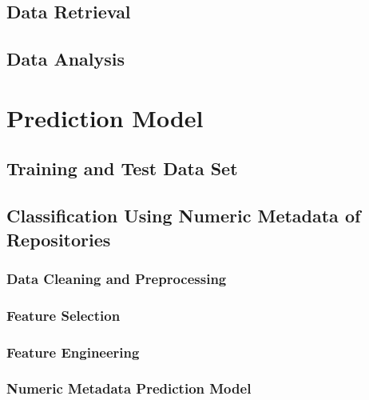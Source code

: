 \documentclass[%
a4paper,
DIV12,
2.5headlines,
bigheadings,
titlepage,
openbib,
]{scrartcl}
\begin{document}
\subsection{Data Retrieval}\label{data-retrieval}



\subsection{Data Analysis}\label{data-analysis}



\section{Prediction Model}\label{prediction-model}



\subsection{Training and Test Data
Set}\label{training-and-test-data-set}



\subsection{Classification Using Numeric Metadata of
Repositories}\label{classification-using-numeric-metadata-of-repositories}


\subsubsection{Data Cleaning and
Preprocessing}\label{data-cleaning-and-preprocessing}



\subsubsection{Feature Selection}\label{feature-selection}



\subsubsection{Feature Engineering}\label{feature-engineering}



\subsubsection{Numeric Metadata Prediction
Model}\label{numeric-metadata-prediction-model}
\end{document}
